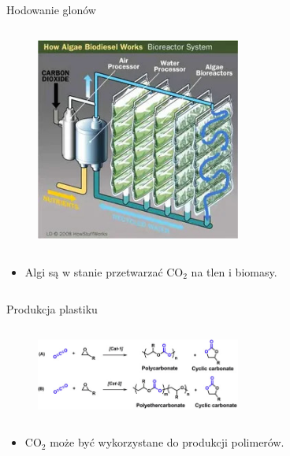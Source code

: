 \begin{columnframe}{Hodowanie glonów}
    \begin{column}{0.5\textwidth}
        \begin{figure}
            \centering
            \includegraphics[width=0.6\textwidth, frame]{images/algae_biodiesel.jpg}
        \end{figure}
    \end{column}
    \begin{column}{0.5\textwidth}
        \begin{itemize}
            \item Algi są w stanie przetwarzać CO$_2$ na tlen i biomasy.
        \end{itemize}
    \end{column}
\end{columnframe}

\begin{columnframe}{Produkcja plastiku}
    \begin{column}{0.5\textwidth}
        \begin{figure}
            \centering
            \includegraphics[width=0.6\textwidth, frame]{images/plastic_from_co2.jpg}
        \end{figure}
    \end{column}
    \begin{column}{0.5\textwidth}
        \begin{itemize}
            \item CO$_2$ może być wykorzystane do produkcji polimerów.
        \end{itemize}
    \end{column}
\end{columnframe}

